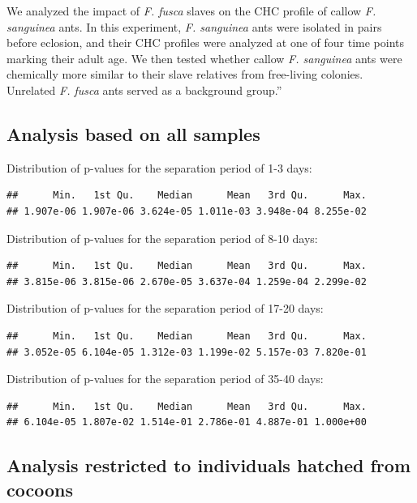 \documentclass[
]{article}
\begin{document}
We analyzed the impact of \emph{F. fusca} slaves on the CHC profile of callow \emph{F. sanguinea} ants. In this experiment, \emph{F. sanguinea} ants were isolated in pairs before eclosion, and their CHC profiles were analyzed at one of four time points marking their adult age. We then tested whether callow \emph{F. sanguinea} ants were chemically more similar to their slave relatives from free-living colonies. Unrelated \emph{F. fusca} ants served as a background group.''

\subsection{Analysis based on all samples}\label{analysis-based-on-all-samples}

Distribution of p-values for the separation period of 1-3 days:

\begin{verbatim}
##      Min.   1st Qu.    Median      Mean   3rd Qu.      Max. 
## 1.907e-06 1.907e-06 3.624e-05 1.011e-03 3.948e-04 8.255e-02
\end{verbatim}

Distribution of p-values for the separation period of 8-10 days:

\begin{verbatim}
##      Min.   1st Qu.    Median      Mean   3rd Qu.      Max. 
## 3.815e-06 3.815e-06 2.670e-05 3.637e-04 1.259e-04 2.299e-02
\end{verbatim}

Distribution of p-values for the separation period of 17-20 days:

\begin{verbatim}
##      Min.   1st Qu.    Median      Mean   3rd Qu.      Max. 
## 3.052e-05 6.104e-05 1.312e-03 1.199e-02 5.157e-03 7.820e-01
\end{verbatim}

Distribution of p-values for the separation period of 35-40 days:

\begin{verbatim}
##      Min.   1st Qu.    Median      Mean   3rd Qu.      Max. 
## 6.104e-05 1.807e-02 1.514e-01 2.786e-01 4.887e-01 1.000e+00
\end{verbatim}

\subsection{Analysis restricted to individuals hatched from cocoons}\label{analysis-restricted-to-individuals-hatched-from-cocoons}
\end{document}
